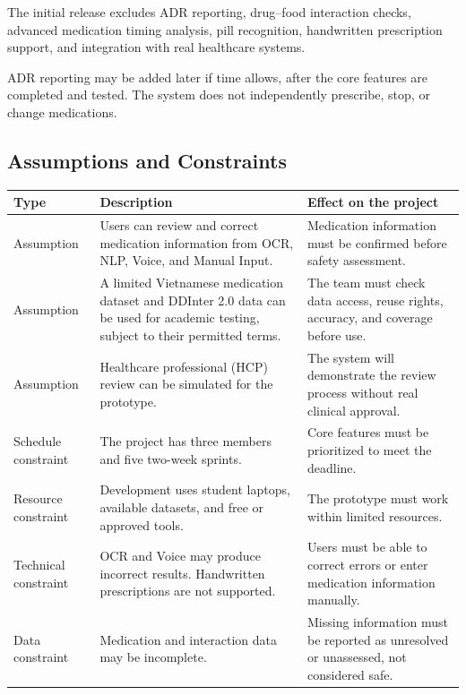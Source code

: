 The initial release excludes ADR reporting, drug--food
interaction checks, advanced medication timing analysis,
pill recognition, handwritten prescription support,
and integration with real healthcare systems.

ADR reporting may be added later if time allows,
after the core features are completed and tested.
The system does not independently prescribe, stop,
or change medications.

\subsection{Assumptions and Constraints}

\begin{longtable}{|L{0.18\textwidth}|L{0.35\textwidth}|L{0.35\textwidth}|}
\hline
\textbf{Type} & \textbf{Description} & \textbf{Effect on the project}\\ \hline

Assumption
& Users can review and correct medication information from OCR,
NLP, Voice, and Manual Input.
& Medication information must be confirmed before safety assessment.
\\ \hline

Assumption
& A limited Vietnamese medication dataset and
DDInter 2.0 data can be used for academic testing,
subject to their permitted terms.
& The team must check data access, reuse rights,
accuracy, and coverage before use.
\\ \hline

Assumption
& Healthcare professional (HCP) review can be simulated
for the prototype.
& The system will demonstrate the review process without
real clinical approval.
\\ \hline

Schedule constraint
& The project has three members and five two-week sprints.
& Core features must be prioritized to meet the deadline.
\\ \hline

Resource constraint
& Development uses student laptops, available datasets,
and free or approved tools.
& The prototype must work within limited resources.
\\ \hline

Technical constraint
& OCR and Voice may produce incorrect results.
Handwritten prescriptions are not supported.
& Users must be able to correct errors or enter medication
information manually.
\\ \hline

Data constraint
& Medication and interaction data may be incomplete.
& Missing information must be reported as unresolved
or unassessed, not considered safe.
\\ \hline


\end{longtable}
